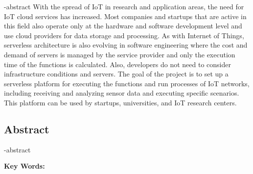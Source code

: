 
\en-abstract{
With the spread of IoT in research and application areas, the need for IoT cloud services has increased. Most companies and startups that are active in this field also operate only at the hardware and software development level and use cloud providers for data storage and processing. As with Internet of Things, serverless architecture is also evolving in software engineering where the cost and demand of servers is managed by the service provider and only the execution time of the functions is calculated. Also, developers do not need to consider infrastructure conditions and servers. The goal of the project is to set up a serverless platform for executing the functions and run processes of IoT networks, including receiving and analyzing sensor data and executing specific scenarios. This platform can be used by startups, universities, and IoT research centers.
}

\newpage
\thispagestyle{empty}
\begin{latin}
\section*{\LARGE\centering Abstract}

\een-abstract

\vspace*{.5cm}
{\large\textbf{Key Words:}}\par
\vspace*{.5cm}
\elatinkeywords
\end{latin}